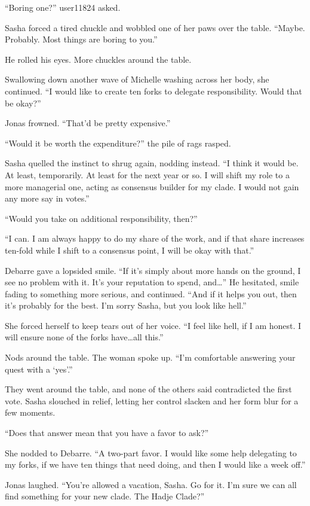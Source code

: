 ``Boring one?'' user11824 asked.

Sasha forced a tired chuckle and wobbled one of her paws over the table. ``Maybe. Probably. Most things are boring to you.''

He rolled his eyes. More chuckles around the table.

Swallowing down another wave of Michelle washing across her body, she continued. ``I would like to create ten forks to delegate responsibility. Would that be okay?''

Jonas frowned. ``That'd be pretty expensive.''

``Would it be worth the expenditure?'' the pile of rags rasped.

Sasha quelled the instinct to shrug again, nodding instead. ``I think it would be. At least, temporarily. At least for the next year or so. I will shift my role to a more managerial one, acting as consensus builder for my clade. I would not gain any more say in votes.''

``Would you take on additional responsibility, then?''

``I can. I am always happy to do my share of the work, and if that share increases ten-fold while I shift to a consensus point, I will be okay with that.''

Debarre gave a lopsided smile. ``If it's simply about more hands on the ground, I see no problem with it. It's your reputation to spend, and\ldots{}'' He hesitated, smile fading to something more serious, and continued. ``And if it helps you out, then it's probably for the best. I'm sorry Sasha, but you look like hell.''

She forced herself to keep tears out of her voice. ``I feel like hell, if I am honest. I will ensure none of the forks have\ldots all this.''

Nods around the table. The woman spoke up. ``I'm comfortable answering your quest with a `yes'.''

They went around the table, and none of the others said contradicted the first vote. Sasha slouched in relief, letting her control slacken and her form blur for a few moments.

``Does that answer mean that you have a favor to ask?''

She nodded to Debarre. ``A two-part favor. I would like some help delegating to my forks, if we have ten things that need doing, and then I would like a week off.''

Jonas laughed. ``You're allowed a vacation, Sasha. Go for it. I'm sure we can all find something for your new clade. The Hadje Clade?''

